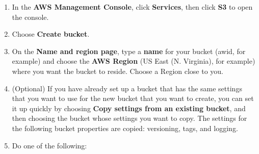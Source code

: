 \documentclass[]{book}
\providecommand{\tightlist}{%
  \setlength{\itemsep}{0pt}\setlength{\parskip}{0pt}}
\begin{document}
\begin{enumerate}
\def\labelenumi{\arabic{enumi}.}
\setcounter{enumi}{39}
\tightlist
\item
  In the \textbf{AWS Management Console}, click \textbf{Services}, then click \textbf{S3} to open the console.
\item
  Choose \textbf{Create bucket}.
\item
  On the \textbf{Name and region page}, type a \textbf{name} for your bucket (awid, for example) and choose the \textbf{AWS Region} (US East (N. Virginia), for example) where you want the bucket to reside. Choose a Region close to you.
\item
  (Optional) If you have already set up a bucket that has the same settings that you want to use for the new bucket that you want to create, you can set it up quickly by choosing \textbf{Copy settings from an existing bucket}, and then choosing the bucket whose settings you want to copy. The settings for the following bucket properties are copied: versioning, tags, and logging.
\item
  Do one of the following:


\end{enumerate}
\end{document}

